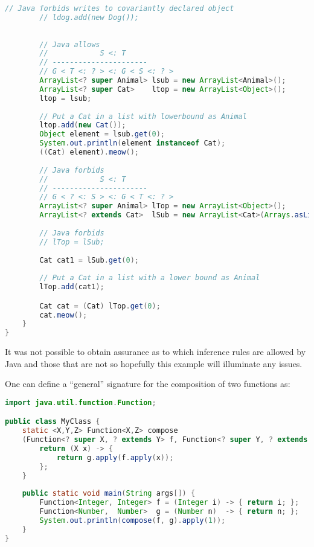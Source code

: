 \documentclass{article}
\begin{document}
\begin{example}
\begin{lstlisting}[escapechar=|, language=Java]
        // Java forbids writes to covariantly declared object
        // ldog.add(new Dog());
        
        
        // Java allows
        //            S <: T
        // ----------------------
        // G < T <: ? > <: G < S <: ? >
        ArrayList<? super Animal> lsub = new ArrayList<Animal>();
        ArrayList<? super Cat>    ltop = new ArrayList<Object>();
        ltop = lsub;
        
        // Put a Cat in a list with lowerbound as Animal
        ltop.add(new Cat());
        Object element = lsub.get(0);
        System.out.println(element instanceof Cat);
        ((Cat) element).meow();
        
        // Java forbids
        //            S <: T
        // ----------------------
        // G < ? <: S > <: G < T <: ? >
        ArrayList<? super Animal> lTop = new ArrayList<Object>();
        ArrayList<? extends Cat>  lSub = new ArrayList<Cat>(Arrays.asList(new Cat()));
        
        // Java forbids
        // lTop = lSub;
        
        Cat cat1 = lSub.get(0);
        
        // Put a Cat in a list with a lower bound as Animal
        lTop.add(cat1);

        Cat cat = (Cat) lTop.get(0);
        cat.meow();
    }
}
\end{lstlisting}
  It was not possible to obtain assurance as to which inference rules are allowed by Java and those that are not so hopefully this example will illuminate any issues.
\end{example}

\begin{example}
  One can define a ``general'' signature for the composition of two functions as:
\begin{lstlisting}[escapechar=|, language=Java]
import java.util.function.Function;

public class MyClass {
    static <X,Y,Z> Function<X,Z> compose
    (Function<? super X, ? extends Y> f, Function<? super Y, ? extends Z> g){
        return (X x) -> {
            return g.apply(f.apply(x));
        };
    }
    
    public static void main(String args[]) {
        Function<Integer, Integer> f = (Integer i) -> { return i; };
        Function<Number,  Number>  g = (Number n)  -> { return n; };
        System.out.println(compose(f, g).apply(1));
    }
}
\end{lstlisting}
\end{example}
\end{document}
